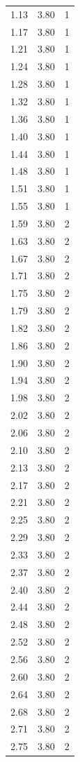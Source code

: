 \begin{longtable}{lrr}
  1.13 & 3.80 & 1 \\
  1.17 & 3.80 & 1 \\
  1.21 & 3.80 & 1 \\
  1.24 & 3.80 & 1 \\
  1.28 & 3.80 & 1 \\
  1.32 & 3.80 & 1 \\
  1.36 & 3.80 & 1 \\
  1.40 & 3.80 & 1 \\
  1.44 & 3.80 & 1 \\
  1.48 & 3.80 & 1 \\
  1.51 & 3.80 & 1 \\
  1.55 & 3.80 & 1 \\
  1.59 & 3.80 & 2 \\
  1.63 & 3.80 & 2 \\
  1.67 & 3.80 & 2 \\
  1.71 & 3.80 & 2 \\
  1.75 & 3.80 & 2 \\
  1.79 & 3.80 & 2 \\
  1.82 & 3.80 & 2 \\
  1.86 & 3.80 & 2 \\
  1.90 & 3.80 & 2 \\
  1.94 & 3.80 & 2 \\
  1.98 & 3.80 & 2 \\
  2.02 & 3.80 & 2 \\
  2.06 & 3.80 & 2 \\
  2.10 & 3.80 & 2 \\
  2.13 & 3.80 & 2 \\
  2.17 & 3.80 & 2 \\
  2.21 & 3.80 & 2 \\
  2.25 & 3.80 & 2 \\
  2.29 & 3.80 & 2 \\
  2.33 & 3.80 & 2 \\
  2.37 & 3.80 & 2 \\
  2.40 & 3.80 & 2 \\
  2.44 & 3.80 & 2 \\
  2.48 & 3.80 & 2 \\
  2.52 & 3.80 & 2 \\
  2.56 & 3.80 & 2 \\
  2.60 & 3.80 & 2 \\
  2.64 & 3.80 & 2 \\
  2.68 & 3.80 & 2 \\
  2.71 & 3.80 & 2 \\
  2.75 & 3.80 & 2 \\

\end{longtable}
